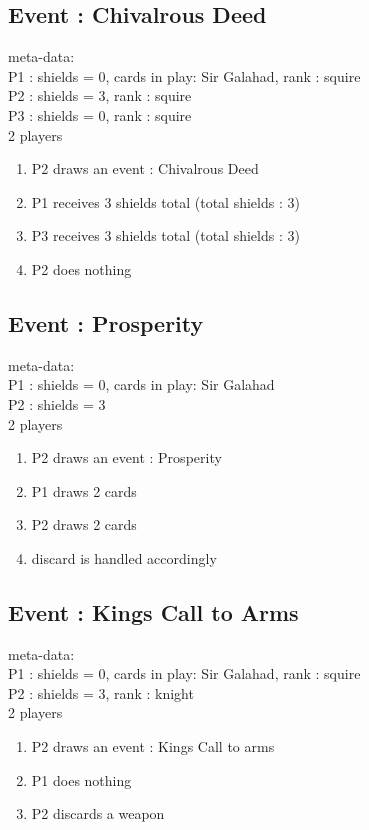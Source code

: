 \documentclass[a4paper,11pt]{article}
\begin{document}
\subsection{Event : Chivalrous Deed}
meta-data:\\
P1 : shields = 0, cards in play: Sir Galahad, rank : squire\\
P2 : shields = 3, rank : squire\\
P3 : shields = 0, rank : squire\\
2 players\\
\begin{enumerate}
	\item P2 draws an event : Chivalrous Deed
	\item P1 receives 3 shields total (total shields : 3)
	\item P3 receives 3 shields total (total shields : 3)
	\item P2 does nothing
\end{enumerate}


\subsection{Event : Prosperity}
meta-data:\\
P1 : shields = 0, cards in play: Sir Galahad\\
P2 : shields = 3\\
2 players\\
\begin{enumerate}
	\item P2 draws an event : Prosperity 
	\item P1 draws 2 cards
	\item P2 draws 2 cards
	\item discard is handled accordingly 
\end{enumerate}

\subsection{Event : Kings Call to Arms}
meta-data:\\
P1 : shields = 0, cards in play: Sir Galahad, rank : squire\\
P2 : shields = 3, rank : knight\\
2 players\\
\begin{enumerate}
	\item P2 draws an event : Kings Call to arms 
	\item P1 does nothing
	\item P2 discards a weapon 
\end{enumerate}
\end{document}
